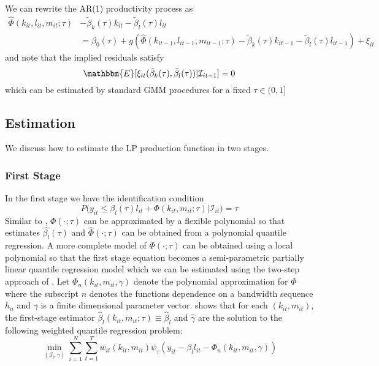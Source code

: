 \documentclass[11pt]{article}
\begin{document}
We can rewrite the AR(1) productivity process as
\begin{equation}
\begin{split}
\hat{\Phi}(k_{it}, l_{it}, m_{it}; \tau)&-\tilde{\beta}_{k}(\tau)k_{it}-\tilde{\beta}_{l}(\tau)l_{it}\\
&=\beta_{0}(\tau)+g(\hat{\Phi}(k_{it-1}, l_{it-1}, m_{it-1}; \tau)-\tilde{\beta}_{k}(\tau)k_{it-1}-\tilde{\beta}_{l}(\tau)l_{it-1})+\xi_{it}
\end{split}
\end{equation}
and note that the implied residuals satisfy
\begin{equation}
\mathbbm{E}[\xi_{it}(\tilde{\beta}_{k}(\tau), \tilde{\beta}_{l}(\tau))|\mathcal{I}_{it-1}]=0
\end{equation}
which can be estimated by standard GMM procedures for a fixed $\tau\in (0,1]$

\subsection{Estimation}
We discuss how to estimate the LP production function in two stages. 
\subsubsection*{First Stage}
In the first stage we have the identification condition
\begin{equation} 
	P\big(y_{it}\leq \beta_{l}(\tau)l_{it}+\Phi(k_{it}, m_{it}; \tau)\big|\mathcal{I}_{it})=\tau
\end{equation}
Similar to \cite{Olley1996}, $\Phi(\cdot;\tau)$ can be approximated by a flexible polynomial so that estimates $\hat{\beta_{l}}(\tau)$ and $\hat{\Phi}(\cdot;\tau)$ can be obtained from a polynomial quantile regression. A more complete model of $\Phi(\cdot;\tau)$ can be obtained using a local polynomial so that the first stage equation becomes a semi-parametric partially linear quantile regression model which we can be estimated using the two-step approach of \cite{Lee2003}. Let $\Phi_{n}(k_{it}, m_{it}, \gamma)$ denote the polynomial approximation for $\Phi$ where the subscript $n$ denotes the functions dependence on a bandwidth sequence $h_{n}$ and $\gamma$ is a finite dimensional parameter vector. \cite{Lee2003} shows that for each $(k_{it}, m_{it})$, the first-stage estimator $\hat{\beta}_{l}(k_{it}, m_{it}; \tau)\equiv \hat{\beta}_{l}$ and $\hat{\gamma}$ are the solution to the following weighted quantile regression problem:
\begin{equation}
\underset{(\beta_{l}, \gamma)}{\operatorname{min}}\sum_{i=1}^{N}\sum_{t=1}^{T}w_{it}(k_{it}, m_{it})\psi_{\tau}(y_{it}-\beta_{l}l_{it}-\Phi_{n}(k_{it}, m_{it}, \gamma))
\end{equation}
\end{document}
